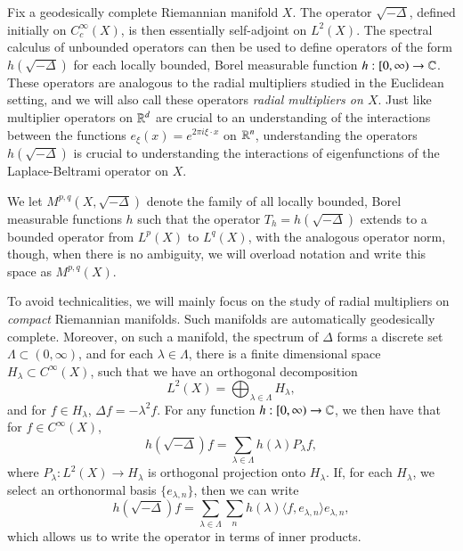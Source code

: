 Fix a geodesically complete Riemannian manifold $X$. The operator $\sqrt{-\Delta}$, defined initially on $C_c^\infty(X)$, is then essentially self-adjoint on $L^2(X)$. The spectral calculus of unbounded operators can then be used to define operators of the form $h(\sqrt{-\Delta})$ for each locally bounded, Borel measurable function $h: [0,\infty) \to \operatorname{\mathbb{C}}$. These operators are analogous to the radial multipliers studied in the Euclidean setting, and we will also call these operators \emph{radial multipliers on $X$}. Just like multiplier operators on $\operatorname{\mathbb{R}}^d$ are crucial to an understanding of the interactions between the functions $e_\xi(x) = e^{2 \pi i \xi \cdot x}$ on $\operatorname{\mathbb{R}}^n$, understanding the operators $h(\sqrt{-\Delta})$ is crucial to understanding the interactions of eigenfunctions of the Laplace-Beltrami operator on $X$.

We let $M^{p,q}(X, \sqrt{-\Delta} )$ denote the family of all locally bounded, Borel measurable functions $h$ such that the operator $T_h = h(\sqrt{-\Delta})$ extends to a bounded operator from $L^p(X)$ to $L^q(X)$, with the analogous operator norm, though, when there is no ambiguity, we will overload notation and write this space as $M^{p,q}(X)$.

To avoid technicalities, we will mainly focus on the study of radial multipliers on \emph{compact} Riemannian manifolds. Such manifolds are automatically geodesically complete. Moreover, on such a manifold, the spectrum of $\Delta$ forms a discrete set $\Lambda \subset (0,\infty)$, and for each $\lambda \in \Lambda$, there is a finite dimensional space $H_\lambda \subset C^\infty(X)$, such that we have an orthogonal decomposition
%
\[ L^2(X) = \bigoplus_{\lambda \in \Lambda} H_\lambda, \]
%
and for $f \in H_\lambda$, $\Delta f = - \lambda^2 f$. For any function $h: [0,\infty) \to \operatorname{\mathbb{C}}$, we then have that for $f \in C^\infty(X)$,
%
\[ h(\sqrt{-\Delta}) f = \sum_{\lambda \in \Lambda} h(\lambda) P_\lambda f, \]
%
where $P_\lambda: L^2(X) \to H_\lambda$ is orthogonal projection onto $H_\lambda$. If, for each $H_\lambda$, we select an orthonormal basis $\{ e_{\lambda,n} \}$, then we can write
%
\[ h(\sqrt{-\Delta}) f = \sum_{\lambda \in \Lambda} \sum_n h(\lambda) \langle f, e_{\lambda,n} \rangle e_{\lambda,n}, \]
%
which allows us to write the operator in terms of inner products.

